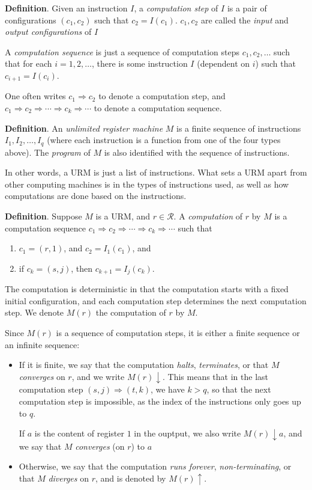 \documentclass[12pt]{article}
\begin{document}
\textbf{Definition}.  Given an instruction $I$, a \emph{computation step} of $I$ is a pair of configurations $(c_1,c_2)$ such that $c_2=I(c_1)$.  $c_1,c_2$ are called the \emph{input} and \emph{output configurations} of $I$

A \emph{computation sequence} is just a sequence of computation steps $c_1, c_2, \ldots$ such that for each $i=1,2,\ldots$, there is some instruction $I$ (dependent on $i$) such that $c_{i+1}=I(c_i)$.

One often writes $c_1\Longrightarrow c_2$ to denote a computation step, and $c_1 \Longrightarrow c_2 \Longrightarrow \cdots \Longrightarrow c_k \Longrightarrow \cdots $ to denote a computation sequence.

\textbf{Definition}.  An \emph{unlimited register machine} $M$ is a finite sequence of instructions $I_1, I_2, \ldots, I_q$ (where each instruction is a function from one of the four types above).  The \emph{program} of $M$ is also identified with the sequence of instructions.

In other words, a URM is just a list of instructions.  What sets a URM apart from other computing machines is in the types of instructions used, as well as how computations are done based on the instructions.

\textbf{Definition}.  Suppose $M$ is a URM, and $r \in \mathcal{R}$.  A \emph{computation} of $r$ by $M$ is a computation sequence $c_1 \Longrightarrow c_2 \Longrightarrow \cdots \Longrightarrow c_k \Longrightarrow \cdots $ such that
\begin{enumerate}
\item $c_1=(r,1)$, and $c_2=I_1(c_1)$, and 
\item if $c_k=(s,j)$, then $c_{k+1}=I_j(c_k)$.
\end{enumerate}
The computation is deterministic in that the computation starts with a fixed initial configuration, and each computation step determines the next computation step.  We denote $M(r)$ the computation of $r$ by $M$.

Since $M(r)$ is a sequence of computation steps, it is either a finite sequence or an infinite sequence: 
\begin{itemize}
\item If it is finite, we say that the computation \emph{halts}, \emph{terminates}, or that $M$ \emph{converges} on $r$, and we write $M(r)\!\downarrow$.  This means that in the last computation step $(s,j)\Longrightarrow (t,k)$, we have $k>q$, so that the next computation step is impossible, as the index of the instructions only goes up to $q$.

If $a$ is the content of register $1$ in the ouptput, we also write $M(r)\!\downarrow a$, and we say that $M$ \emph{converges} (on $r$) to $a$
\item Otherwise, we say that the computation \emph{runs forever}, \emph{non-terminating}, or that $M$ \emph{diverges} on $r$, and is denoted by $M(r)\!\uparrow$.
\end{itemize}
\end{document}
